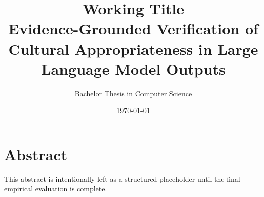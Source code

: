 \documentclass[11pt,a4paper,oneside]{report}
\title{\textbf{Working Title}\\Evidence-Grounded Verification of Cultural Appropriateness in Large Language Model Outputs}
\author{Bachelor Thesis in Computer Science}
\date{\today}
\begin{document}
\maketitle

\chapter*{Abstract}
This abstract is intentionally left as a structured placeholder until the final empirical evaluation is complete.

\tableofcontents
\clearpage
\listoffigures
\clearpage
\listoftables
\clearpage
{}












\appendix





\printbibliography
\end{document}
